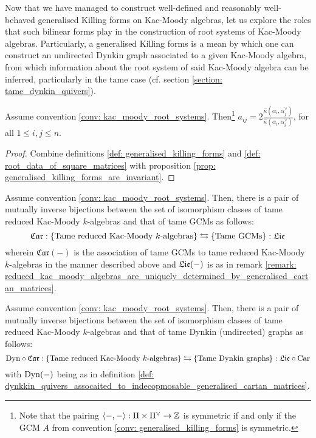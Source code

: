              Now that we have managed to construct well-defined and reasonably well-behaved generalised Killing forms on Kac-Moody algebras, let us explore the roles that such bilinear forms play in the construction of root systems of Kac-Moody algebras. Particularly, a generalised Killing forms is a mean by which one can construct an undirected Dynkin graph associated to a given Kac-Moody algebra, from which information about the root system of said Kac-Moody algebra can be inferred, particularly in the tame case (cf. section \ref{section: tame_dynkin_quivers}).
            \begin{theorem} \label{theorem: reconstructing_generalised_cartan_matrices_from_generalised_killing_forms}
                Assume convention \ref{conv: kac_moody_root_systems}. Then\footnote{Note that the pairing $\<-, -\>: \Pi \x \Pi^{\vee} \to \Z$ is symmetric if and only if the GCM $A$ from convention \ref{conv: generalised_killing_forms} is symmetric.} $a_{ij} = 2\frac{\hat{\kappa}(\alpha_i, \alpha_j^{\vee})}{\hat{\kappa}(\alpha_i, \alpha_i^{\vee})}$, for all $1 \leq i, j \leq n$.
            \end{theorem}
                \begin{proof}
                    Combine definitions \ref{def: generalised_killing_forms} and \ref{def: root_data_of_square_matrices} with proposition \ref{prop: generalised_killing_forms_are_invariant}.
                \end{proof}
            \begin{corollary}
                Assume convention \ref{conv: kac_moody_root_systems}. Then, there is a pair of mutually inverse bijections between the set of isomorphism classes of tame reduced Kac-Moody $k$-algebras and that of tame GCMs as follows:
                    $$\mathfrak{Car}: \{\text{Tame reduced Kac-Moody $k$-algebras}\} \leftrightarrows \{\text{Tame GCMs}\}: \mathfrak{Lie}$$
                wherein $\mathfrak{Car}(-)$ is the association of tame GCMs to tame reduced Kac-Moody $k$-algebras in the manner described above and $\mathfrak{Lie}(-)$ is as in remark \ref{remark: reduced_kac_moody_algebras_are_uniquely_determined_by_generalised_cartan_matrices}.
            \end{corollary}
            \begin{corollary} \label{coro: tame_dynkin_quivers_of_tame_kac_moody_algebras}
                Assume convention \ref{conv: kac_moody_root_systems}. Then, there is a pair of mutually inverse bijections between the set of isomorphism classes of tame reduced Kac-Moody $k$-algebras and that of tame Dynkin (undirected) graphs as follows:
                    $$\mathrm{Dyn} \circ \mathfrak{Car}: \{\text{Tame reduced Kac-Moody $k$-algebras}\} \leftrightarrows \{\text{Tame Dynkin graphs}\}: \mathfrak{Lie} \circ \mathrm{Car}$$
                with $\mathrm{Dyn}(-)$ being as in definition \ref{def: dynkkin_quivers_assocaited_to_indecopmosable_generalised_cartan_matrices}.
            \end{corollary}
